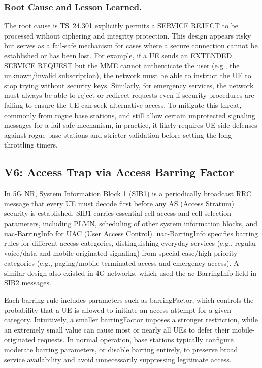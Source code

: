 \documentclass[sigconf]{acmart}
\begin{document}
{\subsubsection{Root Cause and Lesson Learned.} The root cause is TS~24.301 explicitly permits a SERVICE REJECT to be processed without ciphering and integrity protection. This design appears risky but serves as a fail-safe mechanism for cases where a secure connection cannot be established or has been lost. For example, if a UE sends an EXTENDED SERVICE REQUEST but the MME cannot authenticate the user (e.g., the unknown/invalid subscription), the network must be able to instruct the UE to stop trying without security keys. Similarly, for emergency services, the network must always be able to reject or redirect requests even if security procedures are failing to ensure the UE can seek alternative access. 
To mitigate this threat, commonly from rogue base stations, and still allow certain unprotected signaling messages for a fail-safe mechanism, in practice, it likely requires UE-side defenses against rogue base stations and stricter validation before setting the long throttling timers. 



\subsection{V6: Access Trap via Access Barring Factor} 


\noindent In 5G NR, System Information Block 1 (SIB1) is a periodically broadcast RRC message that every UE must decode first before any AS (Access Stratum) security is established. SIB1 carries essential cell-access and cell-selection parameters, including PLMN, scheduling of other system information blocks, and uac-BarringInfo for UAC (User Access Control). uac-BarringInfo specifies barring rules for different access categories, distinguishing everyday services (e.g., regular voice/data and mobile-originated signaling) from special-case/high-priority categories (e.g., paging/mobile-terminated access and emergency access). A similar design also existed in 4G networks, which used the ac-BarringInfo field in SIB2 messages.

Each barring rule includes parameters such as barringFactor, which controls the probability that a UE is allowed to initiate an access attempt for a given category. Intuitively, a smaller barringFactor imposes a stronger restriction, while an extremely small value can cause most or nearly all UEs to defer their mobile-originated requests. In normal operation, base stations typically configure moderate barring parameters, or disable barring entirely, to preserve broad service availability and avoid unnecessarily suppressing legitimate access.


}
\end{document}
